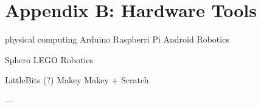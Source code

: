 
\chapter{Appendix B: Hardware Tools} %

\label{AppendixB} %


physical computing
Arduino 
Raspberri Pi
Android Robotics

Sphero
LEGO Robotics



LittleBits (?)
Makey Makey + Scratch



---

